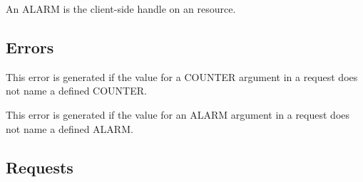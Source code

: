 An ALARM is the client-side handle on an  resource.

\subsection*{Errors}

\begin{description}


This error is generated if the value for a COUNTER argument in a
request does not name a defined COUNTER.


This error is generated if the value for an ALARM argument in a
request does not name a defined ALARM.

\end{description}

\subsection*{Requests}

